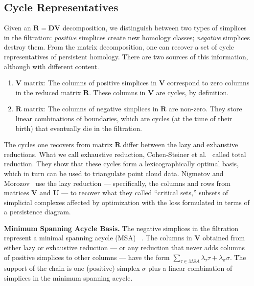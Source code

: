 \documentclass{article}
\newcommand{\mat}[1]{\mathbf{#1}}
\renewcommand{\paragraph}[1]{\noindent\textbf{#1.}}
\begin{document}
\subsection{Cycle Representatives}

Given an $\mat{R} = \mat{D} \mat{V}$ decomposition,
we distinguish between two types of simplices in the filtration: \emph{positive} simplices create new homology classes; \emph{negative} simplices destroy them.
From the matrix decomposition, one can recover a set of cycle representatives of persistent homology.
There are two sources of this information, although with different content.

\begin{enumerate}
    \item $\mat{V}$ matrix: The columns of positive simplices in $\mat{V}$ correspond to zero columns in the reduced matrix $\mat{R}$. These columns in $\mat{V}$ are cycles, by definition.
\item $\mat{R}$ matrix: The columns of negative simplices in $\mat{R}$ are non-zero. They store linear combinations of boundaries, which are cycles (at the time of their birth) that eventually die in the filtration.
\end{enumerate}

The cycles one recovers from matrix $\mat{R}$ differ between the lazy and exhaustive reductions. What we call exhaustive reduction, Cohen-Steiner et al.~\cite{CSLV22} called total reduction. They show that these cycles form a lexicographically optimal basis, which in turn can be used to triangulate point cloud data. Nigmetov and Morozov~\cite{NiMo24} use the lazy reduction --- specifically, the columns and rows from matrices $\mat{V}$ and $\mat{U}$ --- to recover what they called ``critical sets,'' subsets of simplicial complexes affected by optimization with the loss formulated in terms of a persistence diagram.

\vspace{0.1cm}
\paragraph{\textbf{Minimum Spanning Acycle Basis}}
The negative simplices in the filtration represent a minimal spanning acycle (MSA) ~\cite{kalai1983enumeration,skraba2020randomly}. The columns in $\mat{V}$ obtained from either lazy or exhaustive reduction --- or any  reduction that never adds columns of positive simplices to  other columns --- have the form $\sum_{\tau\in MSA} \lambda_\tau \tau + \lambda_\sigma \sigma$. The support of the chain is one (positive) simplex $\sigma$ plus a linear combination of simplices in the minimum spanning acycle.
\end{document}

